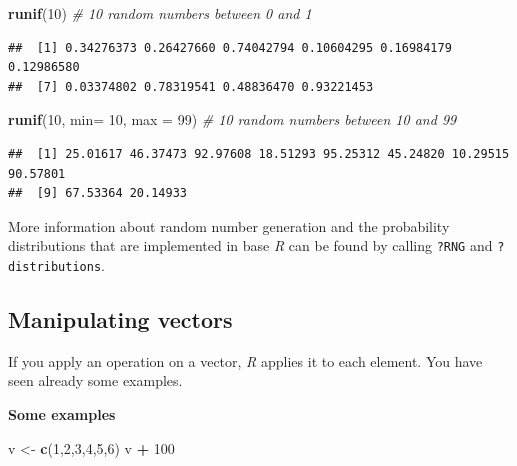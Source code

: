 \documentclass[
]{scrartcl}
\makeatletter
\newenvironment{Shaded}{\begin{snugshade}}{\end{snugshade}}
\newcommand{\AttributeTok}[1]{\textcolor[rgb]{0.13,0.29,0.53}{#1}}
\newcommand{\CommentTok}[1]{\textcolor[rgb]{0.56,0.35,0.01}{\textit{#1}}}
\newcommand{\DecValTok}[1]{\textcolor[rgb]{0.00,0.00,0.81}{#1}}
\newcommand{\FunctionTok}[1]{\textcolor[rgb]{0.13,0.29,0.53}{\textbf{#1}}}
\newcommand{\NormalTok}[1]{#1}
\newcommand{\OtherTok}[1]{\textcolor[rgb]{0.56,0.35,0.01}{#1}}
\newcommand{\SpecialCharTok}[1]{\textcolor[rgb]{0.81,0.36,0.00}{\textbf{#1}}}
\newenvironment{kframe}{%
\medskip{}
\setlength{\fboxsep}{.8em}
 \def\at@end@of@kframe{}%
 \ifinner\ifhmode%
  \def\at@end@of@kframe{\end{minipage}}%
  \begin{minipage}{\columnwidth}%
 \fi\fi%
 \def\FrameCommand##1{\hskip\@totalleftmargin \hskip-\fboxsep
 \colorbox{shadecolor}{##1}\hskip-\fboxsep
     \hskip-\linewidth \hskip-\@totalleftmargin \hskip\columnwidth}%
 \MakeFramed {\advance\hsize-\width
   \@totalleftmargin\z@ \linewidth\hsize
   \@setminipage}}%
 {\par\unskip\endMakeFramed%
 \at@end@of@kframe}
\newenvironment{rmdblock}[1]
  {
  \begin{itemize}
  \renewcommand{\labelitemi}{
    \raisebox{-.7\height}[0pt][0pt]{
      {\setkeys{Gin}{width=3em,keepaspectratio}\texttt{[image: images/\#1]}}
    }
  }
  \setlength{\fboxsep}{1em}
  \begin{kframe}
  \item
  }
  {
  \end{kframe}
  \end{itemize}
  }
\newenvironment{geek}
    {\begin{rmdblock}{geek}}
    {\end{rmdblock}}
\newenvironment{webexsolution}[1]
    {\par\tiny\textbf{#1}}
    {\par}
\newcommand{\webexhide}[1]{\begin{webexsolution}{#1}}
\makeatother
\begin{document}
\begin{Shaded}
\begin{Highlighting}[]
\FunctionTok{runif}\NormalTok{(}\DecValTok{10}\NormalTok{)                     }\CommentTok{\# 10 random numbers between 0 and 1}
\end{Highlighting}
\end{Shaded}

\begin{verbatim}
##  [1] 0.34276373 0.26427660 0.74042794 0.10604295 0.16984179 0.12986580
##  [7] 0.03374802 0.78319541 0.48836470 0.93221453
\end{verbatim}

\begin{Shaded}
\begin{Highlighting}[]
\FunctionTok{runif}\NormalTok{(}\DecValTok{10}\NormalTok{, }\AttributeTok{min=} \DecValTok{10}\NormalTok{, }\AttributeTok{max =} \DecValTok{99}\NormalTok{)  }\CommentTok{\# 10 random numbers between 10 and 99}
\end{Highlighting}
\end{Shaded}

\begin{verbatim}
##  [1] 25.01617 46.37473 92.97608 18.51293 95.25312 45.24820 10.29515 90.57801
##  [9] 67.53364 20.14933
\end{verbatim}

\begin{geek}
More information about random number generation and the probability
distributions that are implemented in base \emph{R} can be found by
calling \texttt{?RNG} and \texttt{?distributions}.
\end{geek}

\subsection{Manipulating vectors}\label{manipulating-vectors}

If you apply an operation on a vector, \emph{R} applies it to each element. You have seen already some examples.

\webexhide{Some examples}

\begin{Shaded}
\begin{Highlighting}[]
\NormalTok{v }\OtherTok{\textless{}{-}} \FunctionTok{c}\NormalTok{(}\DecValTok{1}\NormalTok{,}\DecValTok{2}\NormalTok{,}\DecValTok{3}\NormalTok{,}\DecValTok{4}\NormalTok{,}\DecValTok{5}\NormalTok{,}\DecValTok{6}\NormalTok{)}
\NormalTok{v }\SpecialCharTok{+} \DecValTok{100}
\end{Highlighting}
\end{Shaded}
\end{document}
